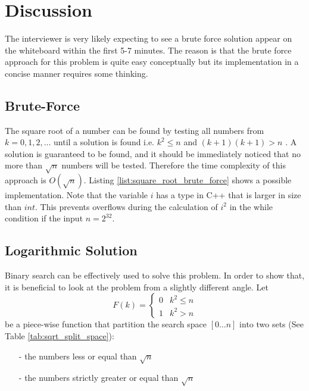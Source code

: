 \section{Discussion}
The interviewer is very likely expecting to see a brute force solution appear on the whiteboard within the first 5-7 minutes. The reason is that the brute force approach for this problem is quite easy conceptually but its implementation in a concise manner requires some thinking. 

\subsection{Brute-Force}
The square root of a number can be found by testing all numbers from $k=0,1,2,\ldots$ until a solution is found i.e. $k^2\leq n$ and $(k+1)(k+1) > n$ . A solution is guaranteed to be found, and it should be immediately noticed that no more than $\sqrt{n}$ numbers will be tested. Therefore the time complexity of this approach is $O(\sqrt{n})$.
Listing \ref{list:square_root_brute_force} shows a possible implementation. Note that the variable $i$ has a type in C++ that is larger in size than $int$. This prevents overflows during the calculation of $i^2$ in the while condition if the input $n=2^{32}$.

\begin{minipage}{\linewidth}
	
\end{minipage}

\subsection{Logarithmic Solution}
Binary search can be effectively used to solve this problem. In order to show that, it is beneficial to look at the problem from a slightly different angle. 
Let 
\begin{equation}
	F(k)=\begin{cases} 
0 & k^2 \leq n \\
1 & k^2 > n
\end{cases}
\label{eq:square_root_piecewice}
\end{equation} 
be a piece-wise function that partition the search space $[0\ldots n]$ into two sets (See Table \ref{tab:sqrt_split_space}):
	\begin{itemize}
      \item [-] the numbers  less or equal than $\sqrt{n}$
      \item [-] the numbers strictly greater or equal than $\sqrt{n}$
	\end{itemize}

